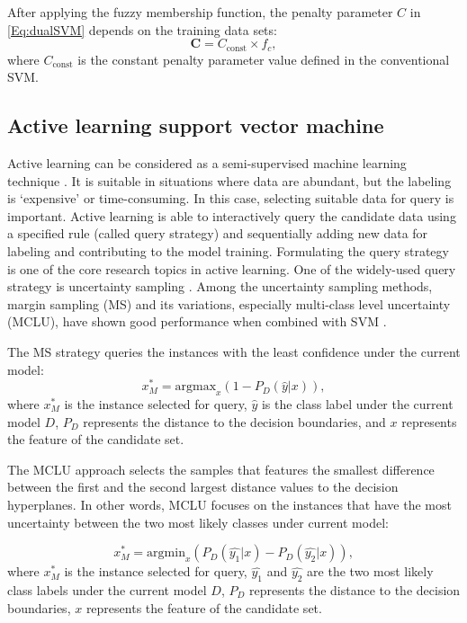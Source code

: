 After applying the fuzzy membership function, the penalty parameter $C$ in \eqref{Eq:dualSVM} depends on the training data sets: 
\begin{equation}
\mathbf{C} = C_{\text{const}} \times f_c,
\end{equation}
where $C_{\text{const}}$ is the constant penalty parameter value defined in the conventional SVM.

\subsection{Active learning support vector machine}
\label{subsec:chap2:active_learning}
Active learning can be considered as a semi-supervised machine learning technique \cite{calma2015new}. 
It is suitable in situations where data are abundant, but the labeling is ‘expensive’ or time-consuming. In this case, selecting suitable data for query is important.
Active learning is able to interactively query the candidate data using a specified rule (called query strategy) and sequentially adding new data for labeling and contributing to the model training. 
Formulating the query strategy is one of the core research topics in active learning. One of the widely-used query strategy is uncertainty sampling \cite{tuia2011survey}. Among the uncertainty sampling methods, margin sampling (MS) and its variations, especially multi-class level uncertainty (MCLU), have shown good performance when combined with SVM \cite{tuia2011survey}.

The MS strategy queries the instances with the least confidence under the current model:
\begin{equation}
\label{eq:MS}
x^*_M = \text{argmax}_x ( 1 - P_{D}(\hat{y} | x) ),
\end{equation}
where $x^*_M$ is the instance selected for query,  $\hat{y}$ is the class label under the current model $D$, $P_{D}$ represents the distance to the decision boundaries, and $x$ represents the feature of the candidate set.
 
The MCLU approach selects the samples that features the smallest difference between the first and the second largest distance values to the decision hyperplanes. In other words,  MCLU focuses on the instances that have the most uncertainty between the two most likely classes under current model:

\begin{equation}
\label{eq:MCLU}
x^*_M = \text{argmin}_x ( P_{D}(\hat{y_1} | x) - P_{D}(\hat{y_2} | x) ),
\end{equation}
where $x^*_M$ is the instance selected for query, $\hat{y_1}$ and $\hat{y_2}$ are the two most likely class labels under the current model $D$, $P_{D}$ represents the distance to the decision boundaries, $x$ represents the feature of the candidate set.

